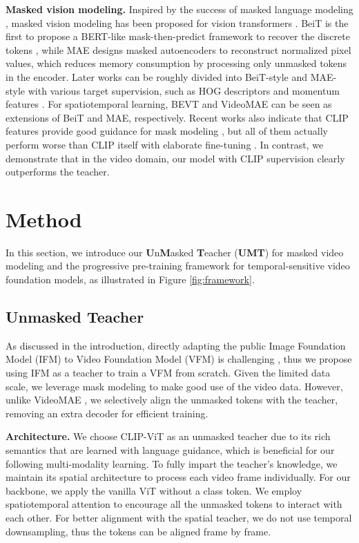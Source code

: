 \documentclass[10pt,twocolumn,letterpaper]{article}
\def\Modelname{\textbf{UMT}}
\begin{document}
\noindent\textbf{Masked vision modeling.} 
Inspired by the success of masked language modeling \cite{lu2019vilbert,dong2019unified}, 
masked vision modeling has been proposed for vision transformers \cite{vit}. 
BeiT \cite{bao2021beit} is the first to propose a BERT-like mask-then-predict framework to recover the discrete tokens \cite{ramesh2021zero}, 
while MAE \cite{mae} designs masked autoencoders to reconstruct normalized pixel values, 
which reduces memory consumption by processing only unmasked tokens in the encoder.
Later works can be roughly divided into BeiT-style \cite{peco,ibot,maskfeat,Baevski2022data2vecAG,maskdistill} and MAE-style \cite{simmim,Chen2022ContextAF,Gao2022ConvMAEMC,huang2022contrastive} with various target supervision, 
such as HOG descriptors \cite{maskfeat} and momentum features \cite{Tao2022SiameseIM}. 
For spatiotemporal learning, 
BEVT \cite{bevt} and VideoMAE \cite{videomae,st_mae} can be seen as extensions of BeiT and MAE, respectively. 
Recent works also indicate that CLIP features provide good guidance for mask modeling \cite{mvp,milan,maskdistill,beitv2,maskalign}, 
but all of them actually perform worse than CLIP itself with elaborate fine-tuning \cite{Dong2022CLIPII}. 
In contrast, 
we demonstrate that in the video domain,
our model with CLIP supervision clearly outperforms the teacher. \section{Method}
In this section, 
we introduce our \textbf{U}n\textbf{M}asked \textbf{T}eacher (\Modelname) for masked video modeling and the progressive pre-training framework for temporal-sensitive video foundation models, 
as illustrated in Figure \ref{fig:framework}.

\subsection{Unmasked Teacher}
As discussed in the introduction, 
directly adapting the public Image Foundation Model (IFM) to Video Foundation Model (VFM) is challenging \cite{xclip,uniformerv2},
thus we propose using IFM as a teacher to train a VFM from scratch. 
Given the limited data scale, 
we leverage mask modeling \cite{mae} to make good use of the video data. 
However, 
unlike VideoMAE \cite{videomae}, 
we 
selectively align the unmasked tokens with the teacher,
removing an extra decoder for efficient training.


\textbf{Architecture.}
We choose CLIP-ViT \cite{clip} as an unmasked teacher due to its rich semantics that are learned with language guidance, 
which is beneficial for our following multi-modality learning. 
To fully impart the teacher's knowledge, 
we maintain its spatial architecture to process each video frame individually.
For our backbone, 
we apply the vanilla ViT without a class token. 
We employ spatiotemporal attention \cite{timesformer} to encourage all the unmasked tokens to interact with each other.
For better alignment with the spatial teacher, 
we do not use temporal downsampling,
thus the tokens can be aligned frame by frame.
\end{document}
